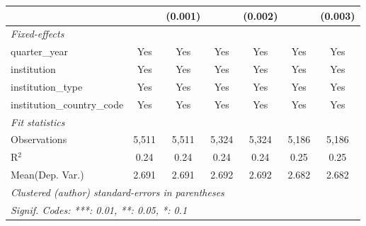 \begin{tabular}{lcccccc}
                                      &               & (0.001)       &               & (0.002)       &               & (0.003)\\   
   \midrule
   \emph{Fixed-effects}\\
   quarter\_year                      & Yes           & Yes           & Yes           & Yes           & Yes           & Yes\\  
   institution                        & Yes           & Yes           & Yes           & Yes           & Yes           & Yes\\  
   institution\_type                  & Yes           & Yes           & Yes           & Yes           & Yes           & Yes\\  
   institution\_country\_code         & Yes           & Yes           & Yes           & Yes           & Yes           & Yes\\  
   \midrule
   \emph{Fit statistics}\\
   Observations                       & 5,511         & 5,511         & 5,324         & 5,324         & 5,186         & 5,186\\  
   R$^2$                              & 0.24          & 0.24          & 0.24          & 0.24          & 0.25          & 0.25\\  
Mean(Dep. Var.) & 2.691 & 2.691 & 2.692 & 2.692 & 2.682 & 2.682 \\
   \midrule \midrule
   \multicolumn{7}{l}{\emph{Clustered (author) standard-errors in parentheses}}\\
   \multicolumn{7}{l}{\emph{Signif. Codes: ***: 0.01, **: 0.05, *: 0.1}}\\
\end{tabular}
\par\endgroup
